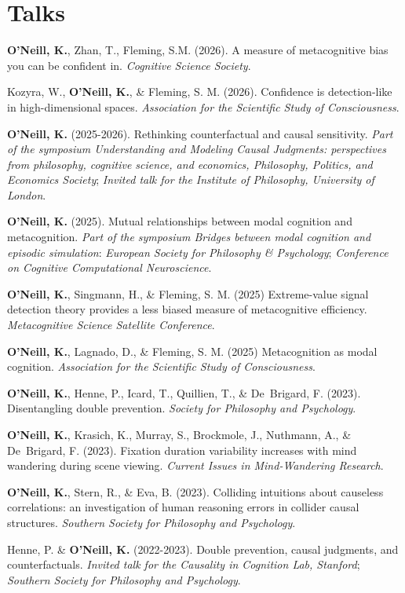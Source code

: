 \section{Talks}
\textbf{O'Neill, K.}, Zhan, T., Fleming, S.M. (2026). A measure of
metacognitive bias you can be confident in. \emph{Cognitive Science
Society}.

Kozyra, W., \textbf{O'Neill, K.}, \& Fleming, S. M. (2026). Confidence
is detection-like in high-dimensional spaces. \emph{Association for
the Scientific Study of Consciousness}.

\textbf{O'Neill, K.} (2025-2026). Rethinking counterfactual and causal
sensitivity. \emph{Part of the symposium Understanding and Modeling
Causal Judgments: perspectives from philosophy, cognitive science, and
economics, Philosophy, Politics, and Economics Society}; \emph{Invited
talk for the Institute of Philosophy, University of London}.

\textbf{O'Neill, K.} (2025). Mutual relationships between modal
cognition and metacognition. \emph{Part of the symposium Bridges
between modal cognition and episodic simulation}: \emph{European
Society for Philosophy \& Psychology}; \emph{Conference on Cognitive
Computational Neuroscience}.

\textbf{O'Neill, K.}, Singmann, H., \& Fleming, S. M. (2025)
Extreme-value signal detection theory provides a less biased measure
of metacognitive efficiency. \emph{Metacognitive Science Satellite
Conference}.

\textbf{O'Neill, K.}, Lagnado, D., \& Fleming, S. M. (2025)
Metacognition as modal cognition. \emph{Association for the
Scientific Study of Consciousness}.

\textbf{O'Neill, K.}, Henne, P., Icard, T., Quillien, T., \&
De~Brigard, F. (2023). Disentangling double
prevention. \emph{Society for Philosophy and Psychology}.

\textbf{O'Neill, K.}, Krasich, K., Murray, S., Brockmole, J.,
Nuthmann, A., \& De~Brigard, F. (2023). Fixation duration variability
increases with mind wandering during scene viewing. \emph{Current
Issues in Mind-Wandering Research}.

\textbf{O'Neill, K.}, Stern, R., \& Eva, B. (2023). Colliding
intuitions about causeless correlations: an investigation of human
reasoning errors in collider causal structures. \emph{Southern
Society for Philosophy and Psychology}.

Henne, P. \& \textbf{O'Neill, K.} (2022-2023). Double prevention,
causal judgments, and counterfactuals. \emph{Invited talk for the
Causality in Cognition Lab, Stanford}; \emph{Southern Society for
Philosophy and Psychology}.

